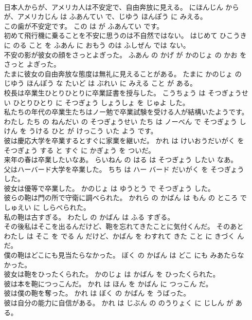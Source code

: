 \documentclass[8pt]{extreport}
\begin{document}
\begin{CJK}{UTF8}{min}
\\	日本人からが、アメリカ人は不安定で、自由奔放に見える。	にほんじん から が、アメリカじん は ふあんてい で、じゆう ほんぽう に みえる。	
\\	この歯が不安定です。	この は が ふあんてい です。	
\\	初めて飛行機に乗ることを不安に思うのは不自然ではない。	はじめて ひこうき に のる こと を ふあん に おもう のは ふしぜん では ない。	
\\	不安の影が彼女の顔をさっとよぎった。	ふあん の かげ が かのじょ の かお を さっと よぎった。	
\\	たまに彼女の自由奔放な態度は無礼に見えることがある。	たまに かのじょ の じゆう ほんぽう な たいど は ぶれい に みえる こと が ある。	
\\	校長は卒業生ひとりひとりに卒業証書を授与した。	こうちょう は そつぎょうせい ひとりひとり に そつぎょう しょうしょ を じゅよ した。	
\\	私たちの年代の卒業生たちはノー勉で卒業試験を受ける人が結構いたようです。	わたし たち の ねんだい の そつぎょうせい たち は ノーべん で そつぎょう しけん を うける ひと が けっこう いた よう です。	
\\	彼は慶応大学を卒業するとすぐに家業を継いだ。	かれ は けいおうだいがく を そつぎょう する と すぐ に かぎょう を ついだ。	
\\	来年の春は卒業したいなあ。	らいねん の はる は そつぎょう したい なあ。	
\\	父はハーバード大学を卒業した。	ちち は ハー バード だいがく を そつぎょう した。	
\\	彼女は優等で卒業した。	かのじょ は ゆうとう で そつぎょう した。	
\\	彼らの鞄は門の所で守衛に調べられた。	かれら の かばん は もん の ところ で しゅえい に しらべられた。	
\\	私の鞄は古すぎる。	わたし の かばん は ふる すぎる。	
\\	その後私はそこを出るんだけど、鞄を忘れてきたことに気付くんだ。	そのあと わたし は そこ を でる ん だけど、かばん を わすれて きた こと に きづく ん だ。	
\\	僕の鞄はどこにも見当たらなかった。	ぼく の かばん は どこ にも みあたらなかった。	
\\	彼女は鞄をひったくられた。	かのじょ は かばん を ひったくられた。	
\\	彼は本を鞄につっこんだ。	かれ は ほん を かばん に つっこん だ。	
\\	彼は僕の鞄を奪った。	かれ は ぼく の かばん を うばった。	
\\	彼は自分の能力に自信がある。	かれ は じぶん の のうりょく に じしん が ある。	

\end{CJK}
\end{document}
